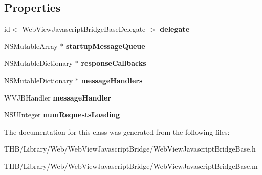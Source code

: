 \subsection*{Properties}
\begin{DoxyCompactItemize}
\item 
\mbox{\label{interface_web_view_javascript_bridge_base_a23f1433ddb0b051523a1ce7b29edf02e}} 
id$<$ Web\+View\+Javascript\+Bridge\+Base\+Delegate $>$ {\bfseries delegate}
\item 
\mbox{\label{interface_web_view_javascript_bridge_base_ad551d1de5ac075e00f6bf3fd7dcd44ef}} 
N\+S\+Mutable\+Array $\ast$ {\bfseries startup\+Message\+Queue}
\item 
\mbox{\label{interface_web_view_javascript_bridge_base_ad38701176a803fde0757d59503053342}} 
N\+S\+Mutable\+Dictionary $\ast$ {\bfseries response\+Callbacks}
\item 
\mbox{\label{interface_web_view_javascript_bridge_base_aae4722c075d598b613cb361164d2f9ef}} 
N\+S\+Mutable\+Dictionary $\ast$ {\bfseries message\+Handlers}
\item 
\mbox{\label{interface_web_view_javascript_bridge_base_adb74841738169318fede2f167f928572}} 
W\+V\+J\+B\+Handler {\bfseries message\+Handler}
\item 
\mbox{\label{interface_web_view_javascript_bridge_base_a787842602d3e3e821bcb5b37edac4164}} 
N\+S\+U\+Integer {\bfseries num\+Requests\+Loading}
\end{DoxyCompactItemize}


The documentation for this class was generated from the following files\+:\begin{DoxyCompactItemize}
\item 
T\+H\+B/\+Library/\+Web/\+Web\+View\+Javascript\+Bridge/Web\+View\+Javascript\+Bridge\+Base.\+h\item 
T\+H\+B/\+Library/\+Web/\+Web\+View\+Javascript\+Bridge/Web\+View\+Javascript\+Bridge\+Base.\+m\end{DoxyCompactItemize}
